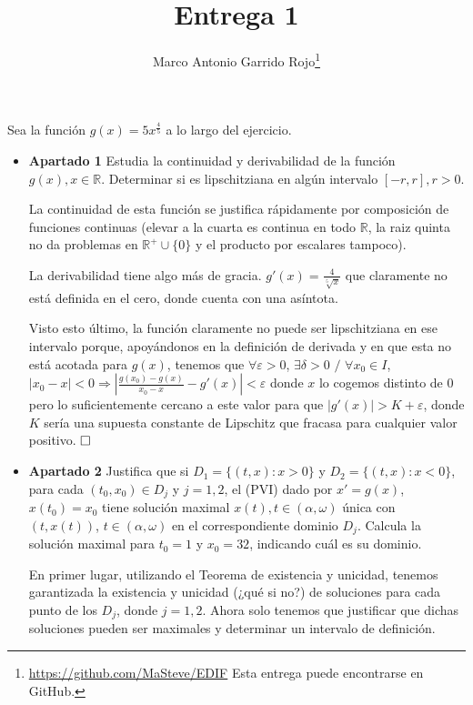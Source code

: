 \documentclass[spanish, a4paper, 12pt] {article}
\begin{document}
\title{\vspace{-1.75cm}Entrega 1}
\author{Marco Antonio Garrido Rojo\thanks{\url{https://github.com/MaSteve/EDIF} Esta entrega puede encontrarse en GitHub.}\vspace{-0.5cm}}
\date{\vspace{-0.5cm}}
\maketitle
\vspace{-0.25cm}
Sea la función $g(x) = 5x^{\frac{4}{5}}$ a lo largo del ejercicio.
\begin{itemize}
\item{
\textbf{Apartado 1} Estudia la continuidad y derivabilidad de la función $g(x), x \in \mathbb{R}$. Determinar si es lipschitziana en algún intervalo $[-r, r], r > 0$.

La continuidad de esta función se justifica rápidamente por composición de funciones continuas (elevar a la cuarta es continua en todo $\mathbb{R}$, la raiz quinta no da problemas en $\mathbb{R}^{+} \cup \{0\}$ y el producto por escalares tampoco).

La derivabilidad tiene algo más de gracia. $g'(x) = \frac{4}{\sqrt[5]{x}}$ que claramente no está definida en el cero, donde cuenta con una asíntota.

Visto esto último, la función claramente no puede ser lipschitziana en ese intervalo porque, apoyándonos en la definición de derivada y en que esta no está acotada para $g(x)$, tenemos que $\forall \varepsilon > 0$, $\exists \delta > 0$ $/$ $\forall x_0 \in I$, $|x_0 - x| < 0 \Rightarrow |\frac{g(x_0)-g(x)}{x_0 - x} - g'(x)| < \varepsilon$ donde $x$ lo cogemos distinto de $0$ pero lo suficientemente cercano a este valor para que $|g'(x)| > K + \varepsilon$, donde $K$ sería una supuesta constante de Lipschitz que fracasa para cualquier valor positivo.
$\hfill \square$
}
\item{
\textbf{Apartado 2} Justifica que si $D_1 = \{(t,x): x > 0\}$ y $D_2 = \{(t,x): x < 0\}$, para cada $(t_0, x_0) \in D_j$ y $j = 1, 2$, el (PVI) dado por $x' = g(x)$, $x(t_0) = x_0$ tiene solución maximal $x(t), t \in (\alpha, \omega)$ única con $(t, x(t))$, $t \in (\alpha, \omega)$ en el correspondiente dominio $D_j$. Calcula la solución maximal para $t_0 = 1$ y $x_0 = 32$, indicando cuál es su dominio.

En primer lugar, utilizando el Teorema de existencia y unicidad, tenemos garantizada la existencia y unicidad (¿qué si no?) de soluciones para cada punto de los $D_j$, donde $j = 1, 2$. Ahora solo tenemos que justificar que dichas soluciones pueden ser maximales y determinar un intervalo de definición.

}
\end{itemize}
\end{document}
